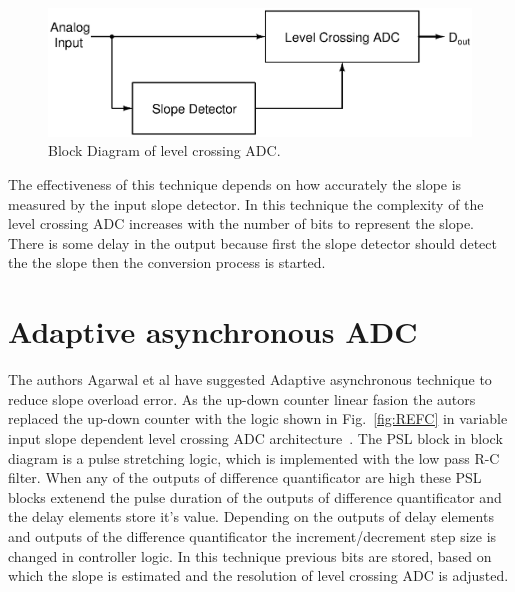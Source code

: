 \begin{figure}[h]
	\begin{center}
		\includegraphics[scale=0.6]{./Figures/REFB.ps}
		\caption{Block Diagram of level crossing ADC.}
		\label{fig:REFB}
	\end{center}
\end{figure}

\par
\hspace{0.6cm} The effectiveness of this technique depends on how accurately the slope is measured by the input slope detector. In this technique the complexity of the level crossing ADC increases with the number of bits to represent the slope. There is some delay in the output because first the slope detector should detect the the slope then the conversion process is started.






\section{ Adaptive asynchronous ADC}

\par
\hspace{0.6cm} The authors Agarwal et al have suggested Adaptive asynchronous technique to reduce slope overload error. As the up-down counter linear fasion the autors replaced the up-down counter with the logic shown in Fig.~\ref{fig:REFC} in variable input slope dependent level crossing ADC architecture~\cite{agarwal2009adaptive}. The PSL block in block diagram is a pulse stretching logic, which is implemented with the low pass R-C filter. When any of the outputs of difference quantificator are high these PSL blocks extenend the pulse duration of the outputs of difference quantificator and the delay elements store it's value. Depending on the outputs of delay elements and outputs of the difference quantificator the increment/decrement step size is changed in controller logic. In this technique previous bits are stored, based on which the slope is estimated and the resolution of level crossing ADC is adjusted. 

